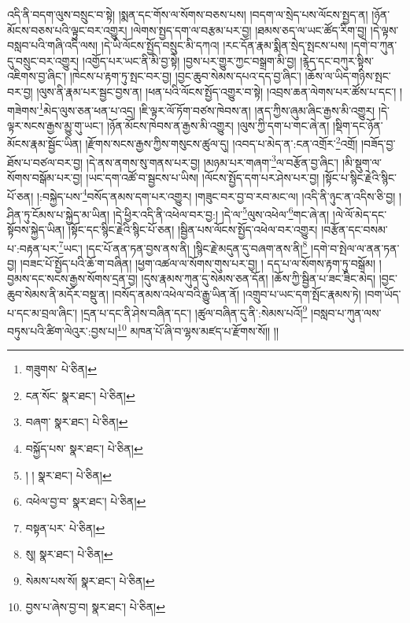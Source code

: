 འདི་ནི་བདག་ལུས་བསྲུང་བ་སྟེ། །སྨན་དང་གོས་ལ་སོགས་བཅས་པས། །བདག་ལ་སྲེད་པས་ལོངས་སྤྱད་ན། །ཉོན་མོངས་བཅས་པའི་ལྟུང་བར་འགྱུར། །ལེགས་སྤྱད་དག་ལ་བརྩམ་པར་བྱ། །ཐམས་ཅད་ལ་ཡང་ཚོད་རིག་བྱ། །དེ་ལྟས་བསླབ་པའི་གཞི་འདི་ལས། །དེ་ཡི་ལོངས་སྤྱོད་བསྲུང་མི་དཀའ། །རང་དོན་རྣམ་སྨིན་སྲེད་སྤངས་པས། །དགེ་བ་ཀུན་དུ་བསྲུང་བར་འགྱུར། །འགྱོད་པར་ཡང་ནི་མི་བྱ་སྟེ། །བྱས་པར་གྱུར་ཀྱང་བསྒྲག་མི་བྱ། །རྙེད་དང་བཀུར་སྟིས་འཇིགས་བྱ་ཞིང་། །ཁེངས་པ་རྟག་ཏུ་སྤང་བར་བྱ། །བྱང་ཆུབ་སེམས་དཔའ་དད་བྱ་ཞིང་། །ཆོས་ལ་ཡིད་གཉིས་སྤང་བར་བྱ། །ལུས་ནི་རྣམ་པར་སྦྱང་བྱས་ན། །ཕན་པའི་ལོངས་སྤྱོད་འགྱུར་བ་སྟེ། །འབྲས་ཆན་ལེགས་པར་ཚོས་པ་དང་། །གཟེགས་\footnote{གཟུགས་  པེ་ཅིན། }མེད་ལུས་ཅན་ཕན་པ་འདྲ། །ཇི་ལྟར་ལོ་ཏོག་བཙས་ཁེབས་ན། །ནད་ཀྱིས་ཞུམ་ཞིང་རྒྱས་མི་འགྱུར། །དེ་ལྟར་སངས་རྒྱས་མྱུ་གུ་ཡང་། །ཉོན་མོངས་ཁེབས་ན་རྒྱས་མི་འགྱུར། །ལུས་ཀྱི་དག་པ་གང་ཞེ་ན། །སྡིག་དང་ཉོན་མོངས་རྣམ་སྦྱོང་ཡིན། །རྫོགས་སངས་རྒྱས་ཀྱིས་གསུངས་ཚུལ་དུ། །འབད་པ་མེད་ན་:ངན་འགྲོར་\footnote{ངན་སོང་  སྣར་ཐང་།  པེ་ཅིན། }འགྲོ། །བཟོད་བྱ་ཐོས་པ་བཙལ་བར་བྱ། །དེ་ནས་ནགས་སུ་གནས་པར་བྱ། །མཉམ་པར་གཞག་\footnote{བཞག་  སྣར་ཐང་།  པེ་ཅིན། }ལ་བརྩོན་བྱ་ཞིང་། །མི་སྡུག་ལ་སོགས་བསྒོམ་པར་བྱ། །ཡང་དག་འཚོ་བ་སྦྱངས་པ་ཡིས། །ལོངས་སྤྱོད་དག་པར་ཤེས་པར་བྱ། །སྟོང་པ་སྙིང་རྗེའི་སྙིང་པོ་ཅན། །:བསྐྱེད་པས་\footnote{བསྐྱོད་པས་  སྣར་ཐང་།  པེ་ཅིན། }བསོད་ནམས་དག་པར་འགྱུར། །གཟུང་བར་བྱ་བ་རབ་མང་ལ། །འདི་ནི་ཉུང་ན་འདིས་ཅི་བྱ། །ཤིན་ཏུ་ངོམས་པ་སྐྱེད་མ་ཡིན། །དེ་ཕྱིར་འདི་ནི་འཕེལ་བར་བྱ:། །དེ་ལ་\footnote{། །  སྣར་ཐང་།  པེ་ཅིན། }ལུས་འཕེལ་\footnote{འཕེལ་བྱ་བ་  སྣར་ཐང་།  པེ་ཅིན། }གང་ཞེ་ན། །ལེ་ལོ་མེད་དང་སྟོབས་སྐྱེད་ཡིན། །སྟོང་དང་སྙིང་རྗེའི་སྙིང་པོ་ཅན། །སྦྱིན་པས་ལོངས་སྤྱོད་འཕེལ་བར་འགྱུར། །བརྩོན་དང་བསམ་པ་:བརྟན་པར་\footnote{བསྟན་པར་  པེ་ཅིན། }ཡང་། །དང་པོ་ནན་ཏན་བྱས་ནས་ནི། །སྙིང་རྗེ་མདུན་དུ་བཞག་ནས་ནི།\footnote{སུ།  སྣར་ཐང་།  པེ་ཅིན། } །དགེ་བ་སྤེལ་ལ་ནན་ཏན་བྱ། །བཟང་པོ་སྤྱོད་པའི་ཆོ་ག་བཞིན། །ཕྱག་འཚལ་ལ་སོགས་གུས་པར་བྱ། །
དད་པ་ལ་སོགས་རྟག་ཏུ་བསྒོམ། །བྱམས་དང་སངས་རྒྱས་སོགས་དྲན་བྱ། །དུས་རྣམས་ཀུན་དུ་སེམས་ཅན་དོན། །ཆོས་ཀྱི་སྦྱིན་པ་ཟང་ཟིང་མེད། །བྱང་ཆུབ་སེམས་ནི་མདོར་བསྡུ་ན། །བསོད་ནམས་འཕེལ་བའི་རྒྱུ་ཡིན་ནོ། །འགྲུབ་པ་ཡང་དག་སྤོང་རྣམས་ཏེ། །བག་ཡོད་པ་དང་མ་བྲལ་ཞིང་། །དྲན་པ་དང་ནི་ཤེས་བཞིན་དང་། །ཚུལ་བཞིན་དུ་ནི་:སེམས་པའོ།\footnote{སེམས་པས་སོ།  སྣར་ཐང་།  པེ་ཅིན། } །བསླབ་པ་ཀུན་ལས་བཏུས་པའི་ཚིག་ལེའུར་:བྱས་པ།\footnote{བྱས་པ་ཞེས་བྱ་བ།  སྣར་ཐང་།  པེ་ཅིན། } མཁན་པོ་ཞི་བ་ལྷས་མཛད་པ་རྫོགས་སོ།། །།